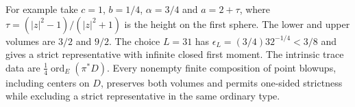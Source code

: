 \enlargethispage{4\baselineskip}
For example take $c=1$, $b=1/4$, $\alpha=3/4$ and $a=2+\tau$, where $\tau=(|z|^2-1)/(|z|^2+1)$ is the height on the first sphere. The lower and upper volumes are $3/2$ and $9/2$. The choice $L=31$ has $\epsilon_L=(3/4)32^{-1/4}<3/8$ and gives a strict representative with infinite closed first moment. The intrinsic trace data are $\frac14\operatorname{ord}_E(\pi^*D)$. Every nonempty finite composition of point blowups, including centers on $D$, preserves both volumes and permits one-sided strictness while excluding a strict representative in the same ordinary type.
